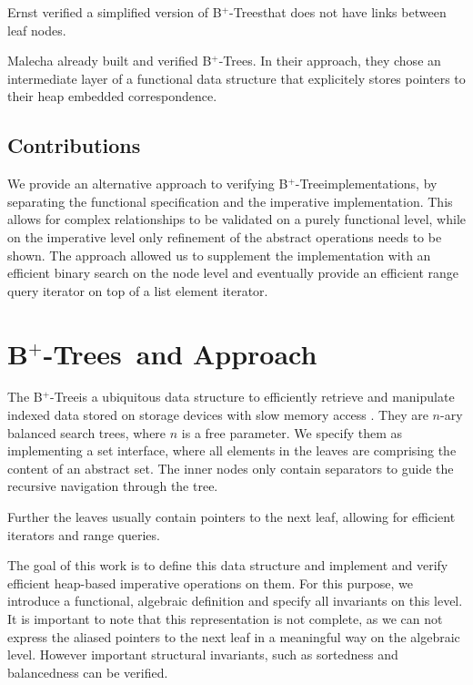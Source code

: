 \documentclass[a4paper,UKenglish,cleveref, autoref, thm-restate]{lipics-v2021}
\newcommand{\btree}{B$^+$-Tree}
\newcommand{\btrees}{B$^+$-Trees}
\begin{document}
Ernst verified a simplified version of \btrees that does
not have links between leaf nodes.

Malecha already built and verified \btrees \cite{}.
In their approach, they chose an intermediate layer of a functional
data structure that explicitely stores pointers to their heap embedded
correspondence.

\subsection{Contributions}
\label{sec:contributions}

We provide an alternative approach to verifying \btree implementations,
by separating the functional specification and the imperative implementation.
This allows for complex relationships to be validated on a purely
functional level, while on the imperative level
only refinement of the abstract operations needs to be shown.
The approach allowed us to supplement the implementation
with an efficient binary search on the node level
and eventually provide an efficient range query iterator
on top of a list element iterator.


\section{\btrees\ and Approach}
\label{sec:approach}

The \btree is a ubiquitous data structure to efficiently retrieve and manipulate
indexed data stored on storage devices with slow memory access \cite{DBLP:journals/csur/Comer79}.
They are $n$-ary balanced search trees, where $n$ is a free parameter.
We specify them as implementing a set interface,
where all elements in the leaves are comprising the content of an abstract set.
The inner nodes only contain separators to guide the recursive navigation through the tree.

Further the leaves usually contain pointers
to the next leaf, allowing for efficient iterators and range queries.

The goal of this work is to define this data structure
and implement and verify efficient heap-based imperative operations on them.
For this purpose, we introduce a functional, algebraic definition and
specify all invariants on this level.
It is important to note that this representation is not complete,
as we can not express the aliased pointers to the next leaf in a meaningful
way on the algebraic level.
However important structural invariants, such as sortedness and balancedness
can be verified.
\end{document}

